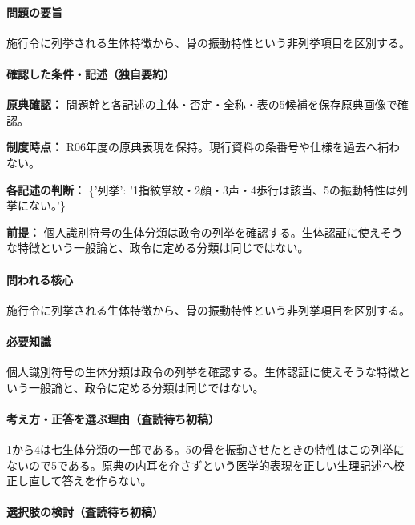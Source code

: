 \paragraph{問題の要旨} 施行令に列挙される生体特徴から、骨の振動特性という非列挙項目を区別する。

\paragraph{確認した条件・記述（独自要約）}\mbox{}\par

\noindent\textbf{原典確認：} 問題幹と各記述の主体・否定・全称・表の5候補を保存原典画像で確認。\par

\noindent\textbf{制度時点：} R06年度の原典表現を保持。現行資料の条番号や仕様を過去へ補わない。\par

\noindent\textbf{各記述の判断：} \{'列挙': '1指紋掌紋・2顔・3声・4歩行は該当、5の振動特性は列挙にない。'\}\par

\noindent\textbf{前提：} 個人識別符号の生体分類は政令の列挙を確認する。生体認証に使えそうな特徴という一般論と、政令に定める分類は同じではない。\par

\paragraph{問われる核心} 施行令に列挙される生体特徴から、骨の振動特性という非列挙項目を区別する。

\paragraph{必要知識} 個人識別符号の生体分類は政令の列挙を確認する。生体認証に使えそうな特徴という一般論と、政令に定める分類は同じではない。

\paragraph{考え方・正答を選ぶ理由（査読待ち初稿）} 1から4は七生体分類の一部である。5の骨を振動させたときの特性はこの列挙にないので5である。原典の内耳を介さずという医学的表現を正しい生理記述へ校正し直して答えを作らない。

\paragraph{選択肢の検討（査読待ち初稿）}\mbox{}\par

